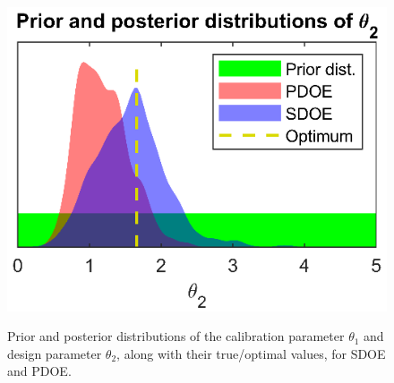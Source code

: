 \documentclass[12pt]{article}
\begin{document}
\begin{figure}
	\includegraphics[scale=0.85]{FIG_dual_calib_SDOE_comp_theta2-d1}\\
	\captionsetup{width=.85\linewidth}
	\caption{Prior and posterior distributions of the calibration parameter $\theta_1$ and design parameter $\theta_2$, along with their true/optimal values, for SDOE and PDOE.}
	\label{fig:sdoe_vs_pdoe}
\end{figure}
%

\bigskip

%
%
%
%




\end{document}
